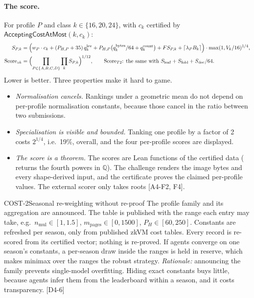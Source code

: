 \label{subsec:cost-score}%
\paragraph{The score.} For profile $P$ and class $k\in\{16,20,24\}$, with $c_k$ certified by
$\mathsf{AcceptingCostAtMost}(k,c_k)$:
\begin{align*}
  S_{P,k}&=\Bigl(w_P\cdot c_k+(P_{H,P}+35)\,q^{\mathrm{lev}}_k
           +P_{H,P}\bigl(q^{\mathrm{bytes}}_k/64+q^{\mathrm{count}}_k\bigr)+FS_{P,k}
           +\lceil\lambda_PB_k\rceil\Bigr)\cdot\max(1,V_k/16)^{1/4},\\
  \mathrm{Score}_{zk}&=\Bigl(\prod_{P\in\{A,B,C,D\}}\prod_{k}S_{P,k}\Bigr)^{1/12},\qquad
  \mathrm{Score}_{T2}\text{: the same with }S_{\mathrm{leaf}}+S_{\mathrm{fold}}+S_{\mathrm{dec}}/64 .
\end{align*}
Lower is better. Three properties make it hard to game.
\begin{itemize}[nosep]
\item \emph{Normalisation cancels.} Rankings under a geometric mean do not depend on per-profile
  normalisation constants, because those cancel in the ratio between two submissions.
\item \emph{Specialisation is visible and bounded.} Tanking one profile by a factor of 2 costs
  $2^{1/4}$, i.e.\ 19\%, overall, and the four per-profile scores are displayed.
\item \emph{The score is a theorem.} The scores are Lean functions of the certified data (
  returns the fourth powers in $\mathbb Q$). The challenge renders the image bytes and every
  shape-derived input, and the certificate proves the claimed per-profile values. The external scorer
  only takes roots [A4-F2, F4].
\end{itemize}

\begin{decision}{COST-2}{Seasonal re-weighting without re-proof}
The profile family and its aggregation are announced. The table is published with the range each
entry may take, e.g.\ $n_{\mathrm{mul}}\in[1,1.5]$, $m_{\mathrm{pages}}\in[0,1500]$,
$P_H\in[60,250]$. Constants are refreshed per season, only from published zkVM cost tables. Every
record is re-scored from its certified vector; nothing is re-proved. If agents converge on one
season's constants, a per-season draw inside the ranges is held in reserve, which makes minimax over
the ranges the robust strategy. \emph{Rationale:} announcing the family prevents single-model
overfitting. Hiding exact constants buys little, because agents infer them from the leaderboard
within a season, and it costs transparency. [D4-6]
\end{decision}

